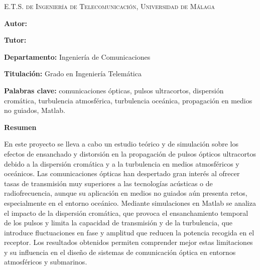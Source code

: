 
\pagestyle{fancy}
\renewcommand{\headrulewidth}{0pt}

\begin{center}
	\scshape
	E.T.S. de Ingeniería de Telecomunicación, Universidad de Málaga
\end{center}

\bigskip

\begin{center}
	\Large \scshape
	\textbf{\tfgtitlename}
\end{center}

\bigskip \bigskip \bigskip

\begin{minipage}{\textwidth}

\textbf{Autor:} \tfgauthorname


\medskip

\textbf{Tutor:} \tfgtutorname



\medskip

\textbf{Departamento:} Ingeniería de Comunicaciones

\medskip

\textbf{Titulación:} Grado en Ingeniería Telemática

\medskip

\textbf{Palabras clave:} comunicaciones ópticas, pulsos ultracortos, dispersión cromática, turbulencia atmosférica, turbulencia oceánica, propagación en medios no guiados, Matlab.

\bigskip \bigskip


\end{minipage}

\begin{center}
	\textbf{Resumen}
\end{center}

En este proyecto se lleva a cabo un estudio teórico y de simulación sobre los efectos de ensanchado y distorsión en la propagación de pulsos ópticos ultracortos debido a la dispersión cromática y a la turbulencia en medios atmosféricos y oceánicos. Las comunicaciones ópticas han despertado gran interés al ofrecer tasas de transmisión muy superiores a las tecnologías acústicas o de radiofrecuencia, aunque su aplicación en medios no guiados aún presenta retos, especialmente en el entorno oceánico.
Mediante simulaciones en Matlab se analiza el impacto de la dispersión cromática, que provoca el ensanchamiento temporal de los pulsos y limita la capacidad de transmisión y de la turbulencia, que introduce fluctuaciones en fase y amplitud que reducen la potencia recogida en el receptor. Los resultados obtenidos permiten comprender mejor estas limitaciones y su influencia en el diseño de sistemas de comunicación óptica en entornos atmosféricos y submarinos. 



\blankpage
